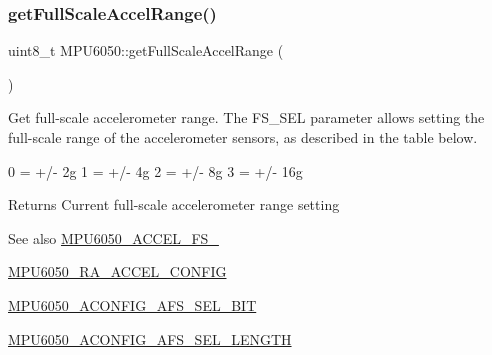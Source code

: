 \begin{DoxyCode}{0}

\end{DoxyCode}
\mbox{\label{classMPU6050_a0fe2dad60c170cee7d614e08f243ffd0}} 
\subsubsection{\texorpdfstring{getFullScaleAccelRange()}{getFullScaleAccelRange()}}
{\footnotesize\ttfamily uint8\+\_\+t M\+P\+U6050\+::get\+Full\+Scale\+Accel\+Range (\begin{DoxyParamCaption}{ }\end{DoxyParamCaption})}

Get full-\/scale accelerometer range. The F\+S\+\_\+\+S\+EL parameter allows setting the full-\/scale range of the accelerometer sensors, as described in the table below.


\begin{DoxyPre}
0 = +/- 2g
1 = +/- 4g
2 = +/- 8g
3 = +/- 16g
\end{DoxyPre}


\begin{DoxyReturn}{Returns}
Current full-\/scale accelerometer range setting 
\end{DoxyReturn}
\begin{DoxySeeAlso}{See also}
\mbox{\hyperlink{MPU6050_8h_aeb63b8456cc4d715ce1fbe29ca5b1722}{M\+P\+U6050\+\_\+\+A\+C\+C\+E\+L\+\_\+\+F\+S\+\_}} 

\mbox{\hyperlink{MPU6050_8h_a48b7d7b24a70b247e373bc5965a5dcc7}{M\+P\+U6050\+\_\+\+R\+A\+\_\+\+A\+C\+C\+E\+L\+\_\+\+C\+O\+N\+F\+IG}} 

\mbox{\hyperlink{MPU6050_8h_a86a744acedbe8a5ec7c82792e050d911}{M\+P\+U6050\+\_\+\+A\+C\+O\+N\+F\+I\+G\+\_\+\+A\+F\+S\+\_\+\+S\+E\+L\+\_\+\+B\+IT}} 

\mbox{\hyperlink{MPU6050_8h_ac2d0f6933b5cee0ffe5bc049eb54536f}{M\+P\+U6050\+\_\+\+A\+C\+O\+N\+F\+I\+G\+\_\+\+A\+F\+S\+\_\+\+S\+E\+L\+\_\+\+L\+E\+N\+G\+TH}} 
\end{DoxySeeAlso}


